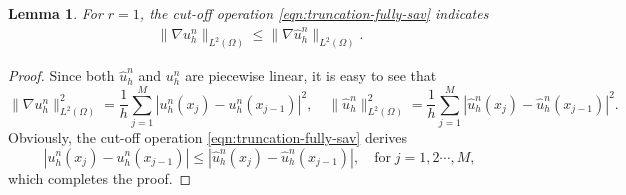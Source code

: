 \documentclass[a4paper, oneside]{book}
\def\II{(\Omega)}
\newtheorem{lemma}{Lemma}[section]
\begin{document}
\begin{lemma}\label{lem:cutoff-energy}
For $r=1$, the cut-off operation \eqref{eqn:truncation-fully-sav} indicates
\begin{align}
  \| \nabla  u_h^{n}\|_{L^2\II} \le  \| \nabla  \hat u_h^{n}\|_{L^2\II}.\label{grd-decay}
\end{align}
\end{lemma}
\begin{proof}
Since both $\hat u_h^{n}$ and $u_h^{n}$ are piecewise linear, it is easy to see that
$$\| \nabla  u_h^{n}\|_{L^2\II}^2=\frac{1}{h}\sum_{j=1}^M\left|u_h^n(x_j)-u_h^n(x_{j-1})\right|^2,\quad \|\hat u_h^{n}\|_{L^2\II}^2=\frac{1}{h}\sum_{j=1}^M\left|\hat u_h^n(x_j)-\hat u_h^n(x_{j-1})\right|^2.
$$
Obviously, the cut-off operation \eqref{eqn:truncation-fully-sav} derives
$$\left|u_h^n(x_j)-u_h^n(x_{j-1})\right|\le \left|\hat u_h^n(x_j)-\hat u_h^n(x_{j-1})\right|,\quad \text{for}\;j=1,2\cdots,M,$$
which completes the proof.
\end{proof}
\end{document}
